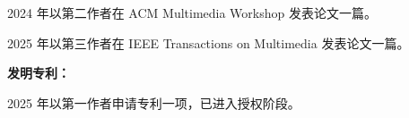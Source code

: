 \begin{achievements}
\begin{enumerate}[label=\text{[\arabic*]}]


  \item 2024 年以第二作者在 ACM Multimedia Workshop 发表论文一篇。
  \item 2025 年以第三作者在 IEEE Transactions on Multimedia 发表论文一篇。
\end{enumerate}

\textbf{发明专利：}
\begin{enumerate}[label=\text{[\arabic*]}] %

  \item 2025 年以第一作者申请专利一项，已进入授权阶段。
\end{enumerate}



\end{achievements}
